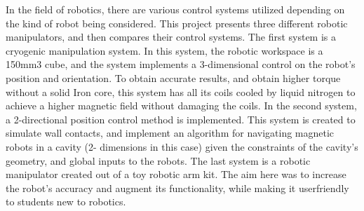 


In the field of robotics, there are various control systems utilized depending on the kind of robot being considered. This project presents three different robotic manipulators, and then compares their control systems. The first system is a cryogenic manipulation system. In this system, the robotic workspace is a 150mm3 cube, and the system implements a 3-dimensional control on the robot’s position and orientation. To obtain accurate results, and obtain higher torque without a solid Iron core, this system has all its coils cooled by liquid nitrogen to achieve a higher magnetic field without damaging the coils.  In the second system, a 2-directional position control method is implemented. This system is created to simulate wall contacts, and implement an algorithm for navigating magnetic robots in a cavity (2- dimensions in this case) given the constraints of the cavity’s geometry, and global inputs to the robots. The last system is a robotic manipulator created out of a toy robotic arm kit. The aim here was to increase the robot’s accuracy and augment its functionality, while making it userfriendly to students new to robotics.  